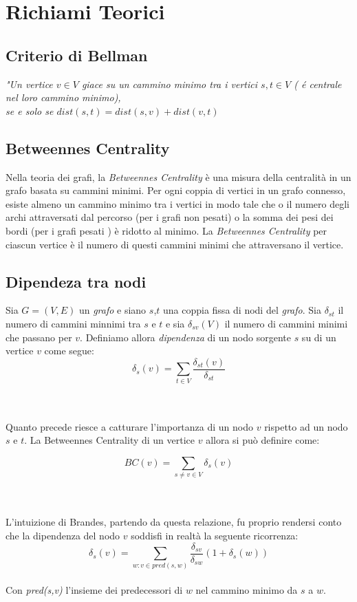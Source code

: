 \chapter{Richiami Teorici}
\section{Criterio di Bellman}
\begin{center}
	\emph{"Un vertice $v \in V$ giace su un cammino minimo tra i vertici $s,t \in V$ ( \'e centrale nel loro cammino minimo),\\ se e solo se $dist(s,t)=dist(s,v)+dist(v,t)$}\\
\end{center}

\section{Betweennes Centrality}
Nella teoria dei grafi, la \emph{Betweennes Centrality} è una misura della centralità in un grafo basata su cammini minimi. Per ogni coppia di vertici in un grafo connesso, esiste almeno un cammino minimo tra i vertici in modo tale che o il numero degli archi attraversati dal percorso (per i grafi non pesati) o la somma dei pesi dei bordi (per i grafi pesati ) è ridotto al minimo. La \emph{Betweennes Centrality}  per ciascun vertice è il numero di questi cammini minimi che attraversano il vertice.

\section{Dipendeza tra nodi}
Sia $G=(V,E)$ un \emph{grafo} e siano $s$,$t$ una coppia fissa di nodi del \emph{grafo}. Sia $\delta_{st} $ il numero di cammini minnimi tra $s$ e $t$ e sia $\delta_{sv}(V)$ il numero di cammini minimi che passano per $v$. Definiamo allora \emph{dipendenza} di un nodo sorgente $s$ su di un vertice $v$ come segue: \\
		$$
			\delta_s(v) = \sum_{t \in V}^{} \frac{\delta_{st}(v)}{\delta_{st}}
 		$$


\noindent \\ \\ Quanto precede riesce a catturare l'importanza di un nodo $v$ rispetto ad un nodo $s$ e $t$. La Betweennes Centrality di un vertice $v$ allora si può definire come:

$$
	BC(v) = \sum_{s\neq v \in V} \delta_s(v)
$$

\noindent \\ \\ L'intuizione di Brandes, partendo da questa relazione, fu proprio rendersi conto che la dipendenza del nodo $v$ soddisfi in realtà la seguente ricorrenza:\\
$$
	\delta_s(v) = \sum_{w:v \in pred(s,w)} \frac{\delta_{sv}}{\delta_{sw}}(1 + \delta_s(w))
$$ 
\noindent	\\ Con \emph{pred(s,v)} l'insieme dei predecessori di $w$ nel cammino minimo da $s$ a $w$.